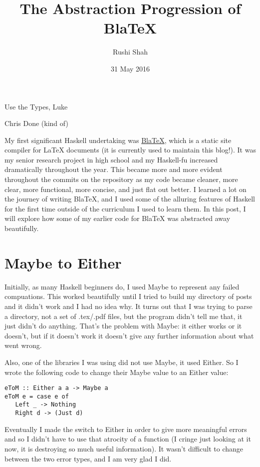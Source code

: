 \documentclass[12pt]{article}
\author{Rushi Shah}
\date{31 May 2016}
\title{The Abstraction Progression of BlaTeX}
\begin{document}
\maketitle

\epigraph{Use the Types, Luke}{Chris Done (kind of)}

My first significant Haskell undertaking was \href{https://github.com/2016rshah/BlaTeX}{BlaTeX}, which is a static site compiler for LaTeX documents (it is currently used to maintain this blog!). It was my senior research project in high school and my Haskell-fu increased dramatically throughout the year. This became more and more evident throughout the commits on the repository as my code became cleaner, more clear, more functional, more concise, and just flat out better. I learned a lot on the journey of writing BlaTeX, and I used some of the alluring features of Haskell for the first time outside of the curriculum I used to learn them. In this post, I will explore how some of my earlier code for BlaTeX was abstracted away beautifully.

\section{Maybe to Either}
Initially, as many Haskell beginners do, I used Maybe to represent any failed compuations. This worked beautifully until I tried to build my directory of posts and it didn't work and I had no idea why. It turns out that I was trying to parse a directory, not a set of .tex/.pdf files, but the program didn't tell me that, it just didn't do anything. That's the problem with Maybe: it either works or it doesn't, but if it doesn't work it doesn't give any further information about what went wrong. 

Also, one of the libraries I was using did not use Maybe, it used Either. So I wrote the following code to change their Maybe value to an Either value:

\begin{verbatim}
eToM :: Either a a -> Maybe a
eToM e = case e of
   Left _ -> Nothing
   Right d -> (Just d)
\end{verbatim}

Eventually I made the switch to Either in order to give more meaningful errors and so I didn't have to use that atrocity of a function (I cringe just looking at it now, it is destroying so much useful information). It wasn't difficult to change between the two error types, and I am very glad I did. 
\end{document}
